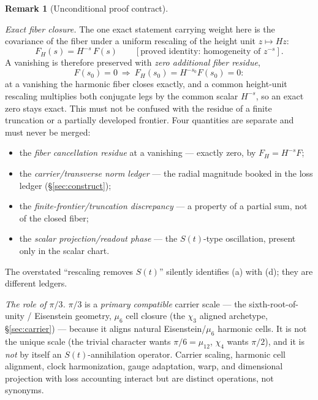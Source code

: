 \documentclass[11pt]{article}
\theoremstyle{definition}
\newtheorem{remark}[theorem]{Remark}
\begin{document}
\begin{remark}[Unconditional proof contract]
\begin{enumerate}
\emph{Exact fiber closure.} The one exact statement carrying weight here is the covariance of the fiber under a
uniform rescaling of the height unit $z\mapsto Hz$:
\[
  F_H(s)=H^{-s}\,F(s)\qquad[\text{proved identity: homogeneity of }z^{-s}].
\]
A vanishing is therefore preserved with \emph{zero additional fiber residue},
\[
  F(s_0)=0\ \Longrightarrow\ F_H(s_0)=H^{-s_0}F(s_0)=0 :
\]
at a vanishing the harmonic fiber closes exactly, and a common height-unit rescaling multiplies both conjugate
legs by the common scalar $H^{-s}$, so an exact zero stays exact. This must not be confused with the residue of
a finite truncation or a partially developed frontier. Four quantities are separate and must never be merged:
\begin{itemize}
\item[(a)] the \emph{fiber cancellation residue} at a vanishing --- exactly zero, by $F_H=H^{-s}F$;
\item[(b)] the \emph{carrier/transverse norm ledger} --- the radial magnitude booked in the loss ledger
(\S\ref{sec:construct});
\item[(c)] the \emph{finite-frontier/truncation discrepancy} --- a property of a partial sum, not of the
closed fiber;
\item[(d)] the \emph{scalar projection/readout phase} --- the $S(t)$-type oscillation, present only in the
scalar chart.
\end{itemize}
The overstated ``rescaling removes $S(t)$'' silently identifies (a) with (d); they are different ledgers.

\emph{The role of $\pi/3$.} $\pi/3$ is a \emph{primary compatible} carrier scale --- the
sixth-root-of-unity / Eisenstein geometry, $\mu_6$ cell closure (the $\chi_3$ aligned archetype,
\S\ref{sec:carrier}) --- because it aligns natural Eisenstein/$\mu_6$ harmonic cells. It is not the unique
scale (the trivial character wants $\pi/6=\mu_{12}$, $\chi_4$ wants $\pi/2$), and it is \emph{not} by itself an
$S(t)$-annihilation operator. Carrier scaling, harmonic cell alignment, clock harmonization, gauge adaptation,
warp, and dimensional projection with loss accounting interact but are distinct operations, not synonyms.


\end{enumerate}
\end{remark}
\end{document}

